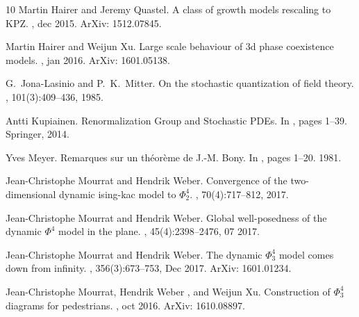 \begin{thebibliography}{10}
  Martin Hairer  and  Jeremy
  Quastel.{\newblock} A class of growth models rescaling to KPZ.{\newblock}
  , dec 2015.{\newblock} ArXiv:
  1512.07845.{\newblock}
  
  Martin Hairer  and  Weijun Xu.{\newblock}
  Large scale behaviour of 3d phase coexistence models.{\newblock}
  , jan 2016.{\newblock} ArXiv:
  1601.05138.{\newblock}
  
  G.~Jona-Lasinio  and 
  P.~K.~Mitter.{\newblock} On the stochastic quantization of field
  theory.{\newblock} , 101(3):409--436, 1985.{\newblock}
  
  Antti Kupiainen.{\newblock}
  Renormalization Group and Stochastic PDEs.{\newblock} In ,  pages  1--39. Springer, 2014.{\newblock}
  
  Yves Meyer.{\newblock} Remarques sur un
  th{\'e}or{\`e}me de J.-M. Bony.{\newblock} In ,  pages  1--20. 1981.{\newblock}
  
  Jean-Christophe Mourrat  and  Hendrik
  Weber.{\newblock} Convergence of the two-dimensional dynamic ising-kac model
  to $\Phi^4_2$.{\newblock} , 70(4):717--812, 2017.{\newblock}
  
  Jean-Christophe Mourrat  and  Hendrik
  Weber.{\newblock} Global well-posedness of the dynamic $\Phi^4$ model in the
  plane.{\newblock} , 45(4):2398--2476, 07
  2017.{\newblock}
  
  Jean-Christophe Mourrat  and  Hendrik
  Weber.{\newblock} The dynamic $\Phi^4_3$ model comes down from
  infinity.{\newblock} ,
  356(3):673--753, Dec 2017.{\newblock} ArXiv: 1601.01234.{\newblock}
  
  Jean-Christophe Mourrat, Hendrik
  Weber , and  Weijun Xu.{\newblock} Construction of $\Phi^4_3$ diagrams for
  pedestrians.{\newblock} , oct
  2016.{\newblock} ArXiv: 1610.08897.{\newblock}
  

\end{thebibliography}
